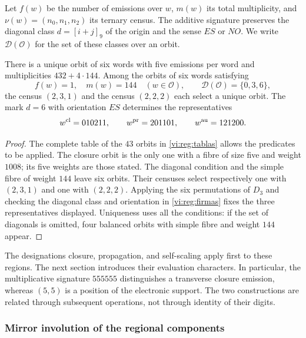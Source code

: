 Let \(f(w)\) be the number of emissions over \(w\), \(m(w)\)
its total multiplicity, and \(\nu(w)=(n_0,n_1,n_2)\) its ternary
census. The additive signature preserves the diagonal class
\(d=[i+j]_9\) of the origin and the sense \(ES\) or \(NO\).
We write \(\mathcal D(\mathcal O)\) for the set of these
classes over an orbit.

\begin{proposition}
\label{vi:reg:seleccion}
There is a unique orbit of six words with five emissions per
word and multiplicities \(432+4\cdot144\). Among the orbits
of six words satisfying
\[
 f(w)=1,\quad m(w)=144\quad(w\in\mathcal O),\qquad
 \mathcal D(\mathcal O)=\{0,3,6\},
\]
the census \((2,3,1)\) and the census \((2,2,2)\) each select
a unique orbit. The mark \(d=6\) with orientation
\(ES\) determines the representatives
\[
 w^{\rm cl}=010211,\qquad w^{\rm pr}=201101,
 \qquad w^{\rm au}=121200.
\]
\end{proposition}
\begin{proof}
The complete table of the \(43\) orbits in
\ref{vi:reg:tablas} allows the predicates to be applied. The closure
orbit is the only one with a fibre of size five and weight \(1008\);
its five weights are those stated. The diagonal condition and the
simple fibre of weight \(144\) leave six orbits. Their censuses
select respectively one with \((2,3,1)\) and one with
\((2,2,2)\). Applying the six permutations of \(D_3\) and
checking the diagonal class and orientation in
\eqref{vi:reg:firmas} fixes the three representatives displayed.
Uniqueness uses all the conditions: if the set of
diagonals is omitted, four balanced orbits with simple fibre
and weight \(144\) appear.
\end{proof}

The designations closure, propagation, and self-scaling apply
first to these regions. The next section introduces their
evaluation characters. In particular, the multiplicative signature
\(555555\) distinguishes a transverse closure emission, whereas
\((5,5)\) is a position of the electronic support. The two
constructions are related through subsequent operations, not
through identity of their digits.

\subsubsection{Mirror involution of the regional components}
\label{mono-ampl:regiones}

